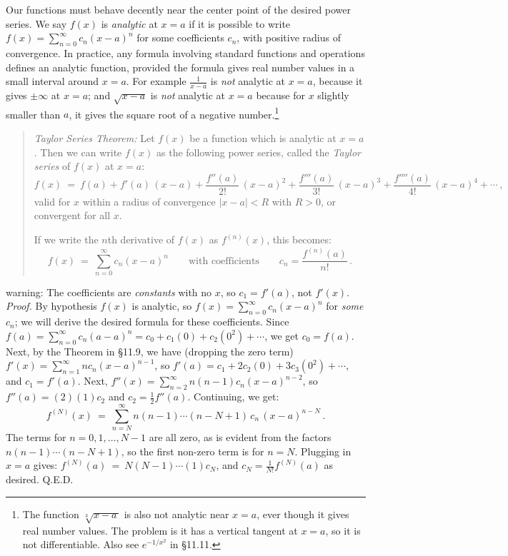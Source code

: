 \documentclass[11pt]{article}
\begin{document}
Our functions must behave decently near the center point of the desired power series.
We say $f(x)$ is {\it analytic} at $x=a$ if it is possible to write $f(x)=\sum_{n=0}^\infty c_n(x{-}a)^n$ for some coefficients $c_n$, with positive radius of convergence.
In practice, any formula involving standard functions and operations 
defines an analytic function, provided the formula gives real number values in a
small interval around $x=a$. For example $\frac{1}{x{-}a}$ is {\it not} analytic at $x=a$, 
because it gives $\pm\infty$ at $x=a$; and $\sqrt{x{-}a}$ is {\it not} analytic at $x=a$ because
for $x$ slightly smaller than $a$, it gives the square root of a negative number.\footnote{
The function $\sqrt[3]{x{-}a\,}$ is also not analytic near $x=a$,
ever though it gives real number values.
The problem is it has a vertical tangent at $x=a$,
so it is not differentiable. Also see $e^{-1/x^2}$ in \S11.11.
} 
\begin{quote}
{\it Taylor Series Theorem:} Let $f(x)$ be a function which is analytic at $x=a$.
Then we can write $f(x)$ as the following power series,  called the {\it Taylor series} of $f(x)$
at $x=a$:
$$
f(x) \ =\ f(a) + f'(a)\,(x{-}a) + \frac{f''(a)}{2!}\,(x{-}a)^2 + \frac{f'''(a)}{3!}\,(x{-}a)^3 + \frac{f''''(a)}{4!}\,(x{-}a)^4 + \cdots\,,
$$
valid for $x$ within a radius of convergence $|x{-}a|<R$ with $R>0$, or convergent for all $x$.

If we write the $n$th derivative of $f(x)$ as $f^{(n)}(x)$, this becomes: 
$$
f(x) \ =\  \sum_{n=0}^\infty c_n(x{-}a)^n
\qquad
\text{with coefficients}
\qquad
c_n=\frac{f^{(n)}(a)}{n!}\,.
$$
\end{quote}
%
{\sc warning:} The coefficients are {\it constants} with no $x$, 
so $c_1 =  f'(a)$, {\sc not} $ f'(x)$.
\\[.5em]
{\it Proof.} By hypothesis $f(x)$ is analytic, so $f(x)=\sum_{n=0}^\infty c_n(x{-}a)^n$ 
for {\it some} $c_n$; we will derive the desired formula for these coefficients. Since $f(a) = \sum_{n=0}^\infty c_n(a{-}a)^n=
c_0 + c_1(0) + c_2(0^2)+\cdots$, we get $c_0=f(a)$. 
Next, by the Theorem in \S11.9, we have (dropping the zero term)
$f'(x) = \sum_{n=1}^\infty nc_n (x{-}a)^{n-1}$, 
so $f'(a) = c_1 + 2c_2(0) + 3c_3(0^2) + \cdots$, and $c_1 = f'(a)$. 
Next, $f''(x) = \sum_{n=2}^\infty n(n{-}1)c_n (x{-}a)^{n-2}$,
 so $f''(a) = (2)(1)c_2$ and $c_2=\frac12 f''(a)$.  Continuing, we get:
$$
f^{(N)}(x) \ =\ \sum_{n=N}^\infty n(n{-}1)\cdots(n{-}N{+}1)\, c_n\,(x{-}a)^{n-N}\,.
$$
The terms for $n= 0,1,\ldots, N{-}1$ are all zero, as is evident from the factors $n(n{-}1)\cdots(n{-}N+1)$,
so the first non-zero term is for $n=N$. Plugging in $x=a$ gives:
$f^{(N)}(a) \ = \ N(N{-}1)\cdots(1)c_N$, and $c_N=\frac{1}{N!} f^{(N)}(a)$ as desired. Q.E.D.
\end{document}
